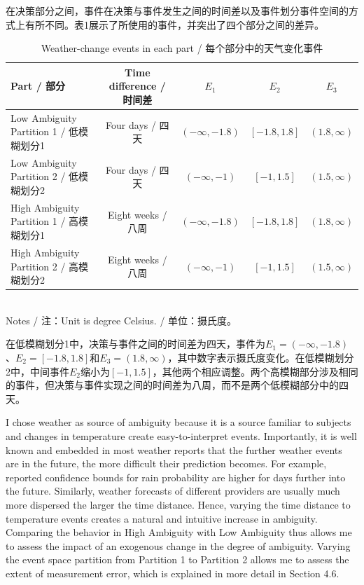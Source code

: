 \documentclass[12pt,a4paper]{article}
\newenvironment{original}
  {\par\medskip\noindent\color{black}\ignorespaces}
  {\par\medskip}
\newenvironment{translation}
  {\par\noindent\color{transblue}\ignorespaces}
  {\par\medskip\medskip}
\begin{document}
\begin{translation}
在决策部分之间，事件在决策与事件发生之间的时间差以及事件划分事件空间的方式上有所不同。表1展示了所使用的事件，并突出了四个部分之间的差异。
\end{translation}

\begin{original}
\begin{table}[H]
\centering
\caption{Weather-change events in each part / 每个部分中的天气变化事件}
\begin{tabular}{lcccc}
\toprule
Part / 部分 & Time difference / 时间差 & $E_1$ & $E_2$ & $E_3$ \\
\midrule
Low Ambiguity Partition 1 / 低模糊划分1  & Four days / 四天    & $(-\infty, -1.8)$ & $[-1.8, 1.8]$ & $(1.8, \infty)$ \\
Low Ambiguity Partition 2 / 低模糊划分2  & Four days / 四天    & $(-\infty, -1)$   & $[-1, 1.5]$   & $(1.5, \infty)$ \\
High Ambiguity Partition 1 / 高模糊划分1 & Eight weeks / 八周  & $(-\infty, -1.8)$ & $[-1.8, 1.8]$ & $(1.8, \infty)$ \\
High Ambiguity Partition 2 / 高模糊划分2 & Eight weeks / 八周  & $(-\infty, -1)$   & $[-1, 1.5]$   & $(1.5, \infty)$ \\
\bottomrule
\end{tabular}
\medskip\\
\footnotesize{Notes / 注：Unit is degree Celsius. / 单位：摄氏度。}
\end{table}
\end{original}

\begin{translation}
在低模糊划分1中，决策与事件之间的时间差为四天，事件为$E_1 = (-\infty, -1.8)$、$E_2 = [-1.8, 1.8]$和$E_3 = (1.8, \infty)$，其中数字表示摄氏度变化。在低模糊划分2中，中间事件$E_2$缩小为$[-1, 1.5]$，其他两个相应调整。两个高模糊部分涉及相同的事件，但决策与事件实现之间的时间差为八周，而不是两个低模糊部分中的四天。
\end{translation}

\begin{original}
I chose weather as source of ambiguity because it is a source familiar to subjects and changes in temperature create easy-to-interpret events. Importantly, it is well known and embedded in most weather reports that the further weather events are in the future, the more difficult their prediction becomes. For example, reported confidence bounds for rain probability are higher for days further into the future. Similarly, weather forecasts of different providers are usually much more dispersed the larger the time distance. Hence, varying the time distance to temperature events creates a natural and intuitive increase in ambiguity. Comparing the behavior in High Ambiguity with Low Ambiguity thus allows me to assess the impact of an exogenous change in the degree of ambiguity. Varying the event space partition from Partition 1 to Partition 2 allows me to assess the extent of measurement error, which is explained in more detail in Section 4.6.
\end{original}
\end{document}
